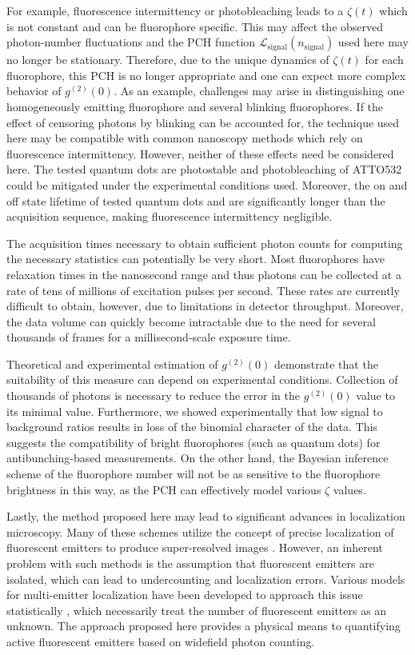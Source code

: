 For example, fluorescence intermittency or photobleaching leads to a $\zeta(t)$ which is not constant and can be fluorophore specific. This may affect the observed photon-number fluctuations and the PCH function $\mathcal{L}_{\mathrm{signal}}(n_{\mathrm{signal}})$ used here may no longer be stationary. Therefore, due to the unique dynamics of $\zeta(t)$ for each fluorophore, this PCH is no longer appropriate and one can expect more complex behavior of $g^{(2)}(0)$. As an example, challenges may arise in distinguishing one homogeneously emitting fluorophore and several blinking fluorophores. If the effect of censoring photons by blinking can be accounted for, the technique used here may be compatible with common nanoscopy methods which rely on fluorescence intermittency. However, neither of these effects need be considered here. The tested quantum dots are photostable and photobleaching of ATTO532 could be mitigated under the experimental conditions used. Moreover, the on and off state lifetime of tested quantum dots and are significantly longer than the acquisition sequence, making fluorescence intermittency negligible. 
 
The acquisition times necessary to obtain sufficient photon counts for computing the necessary statistics can potentially be very short. Most fluorophores have relaxation times in the nanosecond range and thus photons can be collected at a rate of tens of millions of excitation pulses per second. These rates are currently difficult to obtain, however, due to limitations in detector throughput. Moreover, the data volume can quickly become intractable due to the need for several thousands of frames for a millisecond-scale exposure time. 

Theoretical and experimental estimation of $g^{(2)}(0)$ demonstrate that the suitability of this measure can depend on experimental conditions. Collection of thousands of photons is necessary to reduce the error in the $g^{(2)}(0)$ value to its minimal value. Furthermore, we showed experimentally that low signal to background ratios results in loss of the binomial character of the data. This suggests the compatibility of bright fluorophores (such as quantum dots) for antibunching-based measurements. On the other hand, the Bayesian inference scheme of the fluorophore number will not be as sensitive to the fluorophore brightness in this way, as the PCH can effectively model various $\zeta$ values. 

Lastly, the method proposed here may lead to significant advances in localization microscopy. Many of these schemes utilize the concept of precise localization of fluorescent emitters to produce super-resolved images \parencite{Rust2006,Betzig2006}. However, an inherent problem with such methods is the assumption that fluorescent emitters are isolated, which can lead to undercounting and localization errors. Various models for multi-emitter localization have been developed to approach this issue statistically \parencite{Nehme2020,Speiser2021,Li2019,Fazel2019}, which necessarily treat the number of fluorescent emitters as an unknown. The approach proposed here provides a physical means to quantifying active fluorescent emitters based on widefield photon counting.

